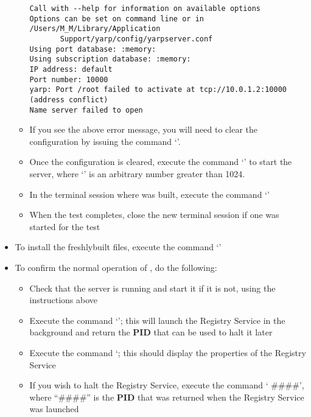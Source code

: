 \begin{itemize}
\begin{itemize}
\begin{verbatim}
Call with --help for information on available options
Options can be set on command line or in /Users/M_M/Library/Application
       Support/yarp/config/yarpserver.conf
Using port database: :memory:
Using subscription database: :memory:
IP address: default
Port number: 10000
yarp: Port /root failed to activate at tcp://10.0.1.2:10000 (address conflict)
Name server failed to open
\end{verbatim}
\outputEnd{}
\item\exSp{} If you see the above error message, you will need to clear the \yarp{}
configuration by issuing the command `'.
\item\exSp{} Once the \yarp{} configuration is cleared, execute the command
`' to start the \yarp{}
server, where `' is an arbitrary number greater than 1024.
\item\exSp{} In the terminal session where \mplusm{} was built, execute the command
`'
\item\exSp{} When the test completes, close the new terminal session if one was started
for the test
\end{itemize}
\item\exSp{} To install the freshly\longDash{}built \mplusm{} files, execute the command
`'
\item\exSp{} To confirm the normal operation of \mplusm{}, do the following:
\begin{itemize}
\item Check that the \yarp{} server is running and start it if it is not, using the
instructions above
\item\exSp{} Execute the command `'; this will launch the
Registry Service in the background and return the \textbf{PID} that can be used to halt it
later
\item\exSp{} Execute the command `; this should display the
properties of the Registry Service
\item\exSp{} If you wish to halt the Registry Service, execute the command
`
\#\#\#\#', where ``\#\#\#\#'' is the \textbf{PID} that was returned when the Registry
Service was launched
\end{itemize}
\end{itemize}
\tertiaryEnd{}
